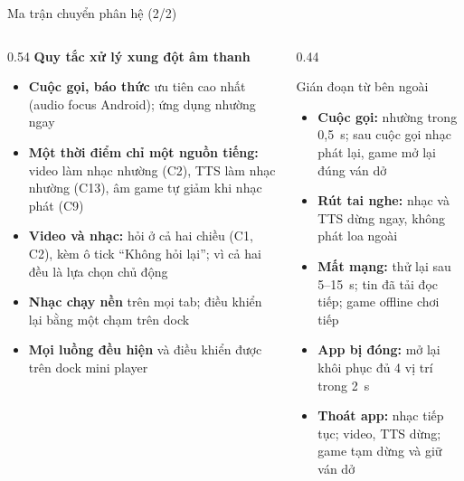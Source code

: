 \documentclass[aspectratio=169]{beamer}
\begin{document}
\begin{frame}{Ma trận chuyển phân hệ (2/2)}
  \begin{columns}
    \begin{column}{0.54\textwidth}
      {\small\textbf{Quy tắc xử lý xung đột âm thanh}}
      \vspace{1mm}
      {\tiny
      \begin{itemize}\itemsep2.5pt
        \item \textbf{Cuộc gọi, báo thức} ưu tiên cao nhất (audio focus Android); ứng dụng nhường ngay
        \item \textbf{Một thời điểm chỉ một nguồn tiếng:} video làm nhạc nhường (C2), TTS làm nhạc nhường (C13), âm game tự giảm khi nhạc phát (C9)
        \item \textbf{Video và nhạc:} hỏi ở cả hai chiều (C1, C2), kèm ô tick ``Không hỏi lại''; vì cả hai đều là lựa chọn chủ động
        \item \textbf{Nhạc chạy nền} trên mọi tab; điều khiển lại bằng một chạm trên dock
        \item \textbf{Mọi luồng đều hiện} và điều khiển được trên dock mini player
      \end{itemize}}
    \end{column}
    \begin{column}{0.44\textwidth}
      \begin{block}{\small Gián đoạn từ bên ngoài}
        {\tiny
        \begin{itemize}\itemsep1.5pt
          \item \textbf{Cuộc gọi:} nhường trong 0,5~s; sau cuộc gọi nhạc phát lại, game mở lại đúng ván dở
          \item \textbf{Rút tai nghe:} nhạc và TTS dừng ngay, không phát loa ngoài
          \item \textbf{Mất mạng:} thử lại sau 5--15~s; tin đã tải đọc tiếp; game offline chơi tiếp
          \item \textbf{App bị đóng:} mở lại khôi phục đủ 4 vị trí trong 2~s
          \item \textbf{Thoát app:} nhạc tiếp tục; video, TTS dừng; game tạm dừng và giữ ván dở
        \end{itemize}}
      \end{block}
    \end{column}
  \end{columns}
\end{frame}

\end{document}

